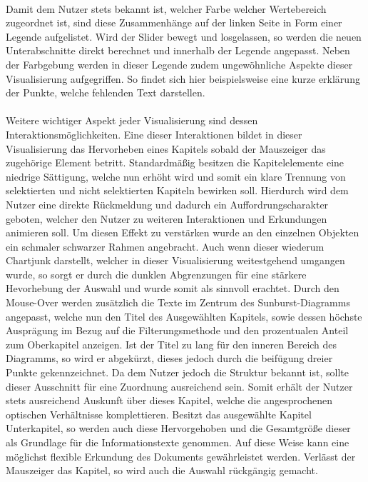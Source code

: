 \\
Damit dem Nutzer stets bekannt ist, welcher Farbe welcher Wertebereich zugeordnet ist, sind diese Zusammenh\"ange auf der linken Seite in Form einer Legende aufgelistet. Wird der Slider bewegt und losgelassen, so werden die neuen Unterabschnitte direkt berechnet und innerhalb der Legende angepasst. Neben der Farbgebung werden in dieser Legende zudem ungew\"ohnliche Aspekte dieser Visualisierung aufgegriffen. So findet sich hier beispielsweise eine kurze erkl\"arung der Punkte, welche fehlenden Text darstellen.\\
\\
Weitere wichtiger Aspekt jeder Visualisierung sind dessen Interaktionsm\"oglichkeiten. Eine dieser Interaktionen bildet in dieser Visualisierung das Hervorheben eines Kapitels sobald der Mauszeiger das zugeh\"orige Element betritt. Standardm\"a{\ss}ig besitzen die Kapitelelemente eine niedrige S\"attigung, welche nun erh\"oht wird und somit ein klare Trennung von selektierten und nicht selektierten Kapiteln bewirken soll. Hierdurch wird dem Nutzer eine direkte R\"uckmeldung und dadurch ein Auffordrungscharakter geboten, welcher den Nutzer zu weiteren Interaktionen und Erkundungen animieren soll. Um diesen Effekt zu verst\"arken wurde an den einzelnen Objekten ein schmaler schwarzer Rahmen angebracht. Auch wenn dieser wiederum Chartjunk darstellt, welcher in dieser Visualisierung weitestgehend umgangen wurde, so sorgt er durch die dunklen Abgrenzungen f\"ur eine st\"arkere Hevorhebung der Auswahl und wurde somit als sinnvoll erachtet. 
Durch den Mouse-Over werden zus\"atzlich die Texte im Zentrum des Sunburst-Diagramms angepasst, welche nun den Titel des Ausgew\"ahlten Kapitels, sowie dessen h\"ochste Auspr\"agung im Bezug auf die Filterungsmethode und den prozentualen Anteil zum Oberkapitel anzeigen. Ist der Titel zu lang f\"ur den inneren Bereich des Diagramms, so wird er abgek\"urzt, dieses jedoch durch die beif\"ugung dreier Punkte gekennzeichnet. Da dem Nutzer jedoch die Struktur bekannt ist, sollte dieser Ausschnitt f\"ur eine Zuordnung ausreichend sein. Somit erh\"alt der Nutzer stets ausreichend Auskunft \"uber dieses Kapitel, welche die angesprochenen optischen Verh\"altnisse komplettieren. Besitzt das ausgew\"ahlte Kapitel Unterkapitel, so werden auch diese Hervorgehoben und die Gesamtgr\"o{\ss}e dieser als Grundlage f\"ur die Informationstexte genommen. Auf diese Weise kann eine m\"oglichst flexible Erkundung des Dokuments gew\"ahrleistet werden. Verl\"asst der Mauszeiger das Kapitel, so wird auch die Auswahl r\"uckg\"angig gemacht. 
